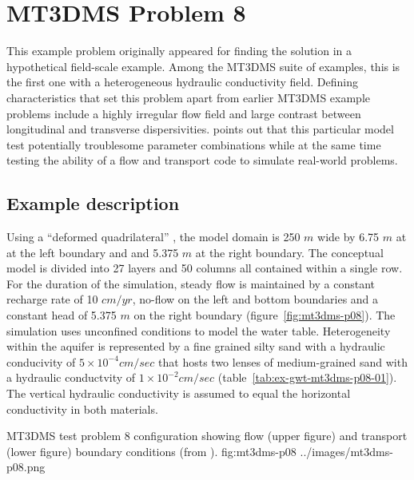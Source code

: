 \section{MT3DMS Problem 8}

This example problem originally appeared \cite{sudicky1989} for finding the solution in a hypothetical field-scale example.  Among the MT3DMS suite of examples, this is the first one with a heterogeneous hydraulic conductivity field.  Defining characteristics that set this problem apart from earlier MT3DMS example problems include a highly irregular flow field and large contrast between longitudinal and transverse dispersivities.  \cite{vanderheijde1995} points out that this particular model test potentially troublesome parameter combinations while at the same time testing the ability of a flow and transport code to simulate real-world problems.

\subsection{Example description}

Using a ``deformed quadrilateral'' \citep{zheng1999mt3dms}, the model domain is 250 $m$ wide by 6.75 $m$ at at the left boundary and and 5.375 $m$ at the right boundary. The conceptual model is divided into 27 layers and 50 columns all contained within a single row.  For the duration of the simulation, steady flow is maintained by a constant recharge rate of 10 $cm/yr$, no-flow on the left and bottom boundaries and a constant head of 5.375 $m$ on the right boundary (figure~\ref{fig:mt3dms-p08}).  The simulation uses unconfined conditions to model the water table.  Heterogeneity within the aquifer is represented by a fine grained silty sand with a hydraulic conducivity of $5 \times 10^{-4} cm/sec$ that hosts two lenses of medium-grained sand with a hydraulic conductvity of $1 \times 10^{-2} cm/sec$ (table~\ref{tab:ex-gwt-mt3dms-p08-01}).  The vertical hydraulic conductivity is assumed to equal the horizontal conductivity in both materials.

\begin{StandardFigure}
	{MT3DMS test problem 8 configuration showing flow (upper figure) and transport (lower figure) boundary conditions (from \cite{sudicky1989}).} 
	{fig:mt3dms-p08}
	{../images/mt3dms-p08.png}
\end{StandardFigure}



